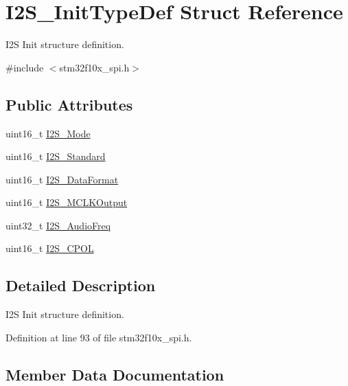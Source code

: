 \hypertarget{struct_i2_s___init_type_def}{}\section{I2\+S\+\_\+\+Init\+Type\+Def Struct Reference}
\label{struct_i2_s___init_type_def}


I2S Init structure definition.  




{\ttfamily \#include $<$stm32f10x\+\_\+spi.\+h$>$}

\subsection*{Public Attributes}
\begin{DoxyCompactItemize}
\item 
uint16\+\_\+t \hyperlink{struct_i2_s___init_type_def_aa57e5190eac245c0873a00849b1bd239}{I2\+S\+\_\+\+Mode}
\item 
uint16\+\_\+t \hyperlink{struct_i2_s___init_type_def_ae987936e7cb9a962ee388c98f8c872b7}{I2\+S\+\_\+\+Standard}
\item 
uint16\+\_\+t \hyperlink{struct_i2_s___init_type_def_ad5e59034081427fd638983c10f18e833}{I2\+S\+\_\+\+Data\+Format}
\item 
uint16\+\_\+t \hyperlink{struct_i2_s___init_type_def_ae7aaf79b7f392d79ac2f7b35a24e5d1a}{I2\+S\+\_\+\+M\+C\+L\+K\+Output}
\item 
uint32\+\_\+t \hyperlink{struct_i2_s___init_type_def_a87674c5fbccad53b7646565f35d1fc0a}{I2\+S\+\_\+\+Audio\+Freq}
\item 
uint16\+\_\+t \hyperlink{struct_i2_s___init_type_def_aeb7741728520734ec2eab95d2143778c}{I2\+S\+\_\+\+C\+P\+OL}
\end{DoxyCompactItemize}


\subsection{Detailed Description}
I2S Init structure definition. 

Definition at line 93 of file stm32f10x\+\_\+spi.\+h.



\subsection{Member Data Documentation}
\mbox{\label{struct_i2_s___init_type_def_a87674c5fbccad53b7646565f35d1fc0a}} 
